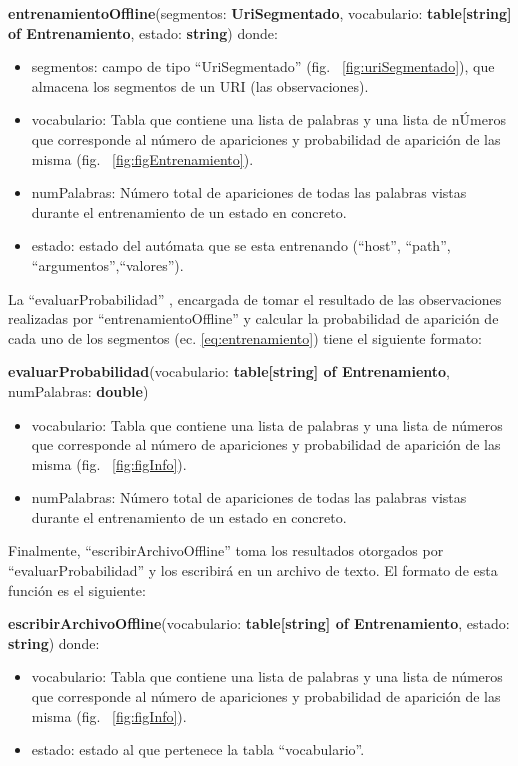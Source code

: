 \textbf{entrenamientoOffline}(segmentos: \textbf{UriSegmentado}, vocabulario: \textbf{table[string] of Entrenamiento}, estado: \textbf{string})
donde:
\begin{itemize}
\item segmentos: campo de tipo ``UriSegmentado'' (fig. ~\ref{fig:uriSegmentado}), que almacena
los segmentos de un URI (las observaciones).
\item vocabulario: Tabla que contiene una lista de palabras y una lista de
nÚmeros que corresponde al número de apariciones y probabilidad de
aparición de las misma (fig. ~\ref{fig:figEntrenamiento}).
\item numPalabras: Número total de apariciones de todas las palabras vistas durante el entrenamiento de un estado en concreto.
\item estado: estado del autómata que se esta entrenando (``host'', ``path'',
``argumentos'',``valores'').
\end{itemize}

La ``evaluarProbabilidad'' , encargada de tomar el resultado de las observaciones realizadas por ``entrenamientoOffline'' y calcular la probabilidad de aparición de cada uno de los segmentos (ec. \ref{eq:entrenamiento}) tiene el siguiente formato:

\textbf{evaluarProbabilidad}(vocabulario: \textbf{table[string] of Entrenamiento},
numPalabras: \textbf{double})
\begin{itemize}
\item vocabulario: Tabla que contiene una lista de palabras y una lista de
números que corresponde al número de apariciones y probabilidad de
aparición de las misma (fig. ~\ref{fig:figInfo}).
\item numPalabras: Número total de apariciones de todas las palabras vistas durante el entrenamiento de un estado en concreto.
\end{itemize}

Finalmente, ``escribirArchivoOffline'' toma los resultados otorgados por
``evaluarProbabilidad'' y los escribirá en un archivo de texto. El formato de
esta función es el siguiente:

\textbf{escribirArchivoOffline}(vocabulario: \textbf{table[string] of Entrenamiento}, estado: \textbf{string})
donde:
\begin{itemize}
\item vocabulario: Tabla que contiene una lista de palabras y una lista de
números que corresponde al número de apariciones y probabilidad de
aparición de las misma (fig. ~\ref{fig:figInfo}).
\item estado: estado al que pertenece la tabla ``vocabulario''.
\end{itemize}

